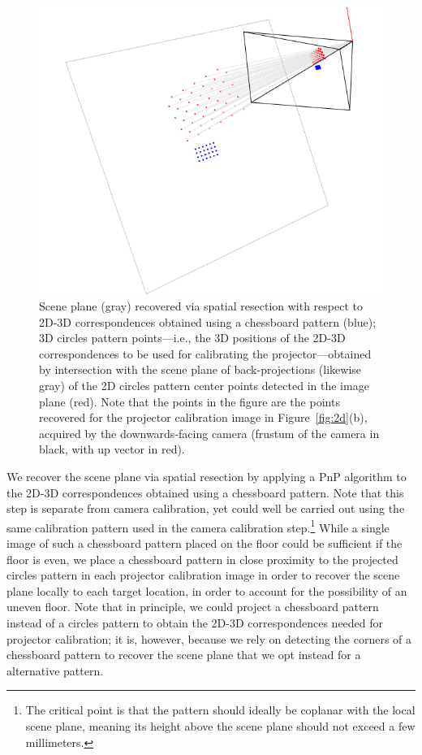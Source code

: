 \documentclass[review]{elsarticle}
\begin{document}
\begin{figure}
    \centerline{\includegraphics[scale=.35]{images/2d3d.png}}
    \caption{Scene plane (gray) recovered via spatial resection with respect to 2D-3D correspondences obtained using a chessboard pattern (blue); 3D circles pattern points---i.e., the 3D positions of the
2D-3D correspondences to be used for calibrating the projector---obtained by intersection with the scene plane of back-projections (likewise gray) of the 2D circles pattern center points detected in the image plane (red). Note that the points in the figure are the points recovered for the projector calibration image in Figure~\ref{fig:2d}(b), acquired by the downwards-facing camera (frustum of the camera in black, with up vector in red).}
    \label{fig:3d}
\end{figure}

We recover the scene plane via spatial resection by applying a PnP algorithm \cite{terzakis2020consistently} to the 2D-3D correspondences obtained using a chessboard pattern. Note that this step is separate from camera calibration, yet could well be carried out using the same calibration pattern used in the camera calibration step.\footnote{The critical point is that the pattern should ideally be coplanar with the local scene plane, meaning its height above the scene plane should not exceed a few millimeters.} While a single image of such a chessboard pattern placed on the floor could be sufficient if the floor is even, we place a chessboard pattern in close proximity to the projected circles pattern in each projector calibration image in order to recover the scene plane locally to each target location, in order to account for the possibility of an uneven floor. Note that in principle, we could project a chessboard pattern instead of a circles pattern to obtain the 2D-3D correspondences needed for projector calibration; it is, however, because we rely on detecting the corners of a chessboard pattern to recover the scene plane that we opt instead for a alternative pattern.
\end{document}
